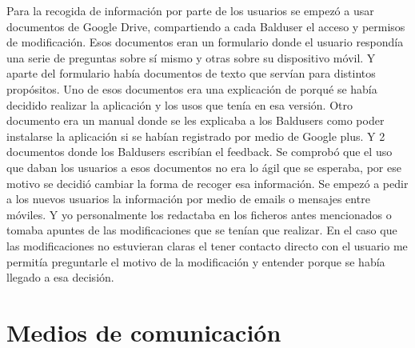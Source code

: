 Para la recogida de información por parte de los usuarios se empezó a usar documentos de Google Drive, compartiendo a cada Balduser el acceso y permisos de modificación.
Esos documentos eran un formulario donde el usuario respondía una serie de preguntas sobre sí mismo y otras sobre su dispositivo móvil. Y aparte del formulario había documentos de texto que servían para distintos propósitos.
Uno de esos documentos era una explicación de porqué se había decidido realizar la aplicación y los usos que tenía en esa versión.
Otro documento era un manual donde se les explicaba a los Baldusers como poder instalarse la aplicación si se habían registrado por medio de Google plus.
Y 2 documentos donde los Baldusers escribían el feedback.
Se comprobó que el uso que daban los usuarios a esos documentos no era lo ágil que se esperaba, por ese motivo se decidió cambiar la forma de recoger esa información.
Se empezó a pedir a los nuevos usuarios la información por medio de emails o mensajes entre móviles. Y yo personalmente los redactaba en los ficheros antes mencionados o tomaba apuntes de las modificaciones que se tenían que realizar.
En el caso que las modificaciones no estuvieran claras el tener contacto directo con el usuario me permitía preguntarle el motivo de la modificación y entender porque se había llegado a esa decisión.

\section{Medios de comunicación}
\label{secc:medios de comunicación}

